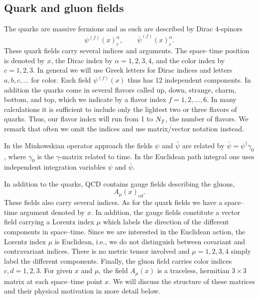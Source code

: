 \subsection{Quark and gluon fields}

The quarks are massive fermions and as such are described by Dirac 4-spinors
\begin{equation}
  \psi^{(f)}(x)^\alpha_c , \qquad \bar\psi^{(f)}(x)^\alpha_c .
\end{equation}
These quark fields carry several indices and arguments. The space--time
position is denoted by $x$, the Dirac index by $\alpha = 1, 2, 3, 4$, and
the color index by $c = 1, 2, 3$. In general we will use Greek letters for
Dirac indices and letters $a, b, c, \ldots$ for color. Each field
$\psi^{(f)}(x)$ thus has 12 independent components. In addition the quarks
come in several flavors called up, down, strange, charm, bottom, and top,
which we indicate by a flavor index $f = 1, 2, \ldots, 6$. In many
calculations it is sufficient to include only the lightest two or three
flavors of quarks. Thus, our flavor index will run from 1 to $N_f$, the
number of flavors. We remark that often we omit the indices and use
matrix/vector notation instead.

In the Minkowskian operator approach the fields $\psi$ and $\bar\psi$ are
related by $\bar\psi = \psi^\dagger \gamma_0$, where $\gamma_0$ is the
$\gamma$-matrix related to time. In the Euclidean path integral one uses
independent integration variables $\psi$ and $\bar\psi$.

In addition to the quarks, QCD contains gauge fields describing the gluons,
\begin{equation}
  A_\mu(x)_{cd} .
\end{equation}
These fields also carry several indices. As for the quark fields we have a
space--time argument denoted by $x$. In addition, the gauge fields
constitute a vector field carrying a Lorentz index $\mu$ which labels the
direction of the different components in space--time. Since we are
interested in the Euclidean action, the Lorentz index $\mu$ is Euclidean,
i.e., we do not distinguish between covariant and contravariant indices.
There is no metric tensor involved and $\mu = 1, 2, 3, 4$ simply label the
different components. Finally, the gluon field carries color indices
$c, d = 1, 2, 3$. For given $x$ and $\mu$, the field $A_\mu(x)$ is a
traceless, hermitian $3 \times 3$ matrix at each space--time point $x$. We
will discuss the structure of these matrices and their physical motivation
in more detail below.


